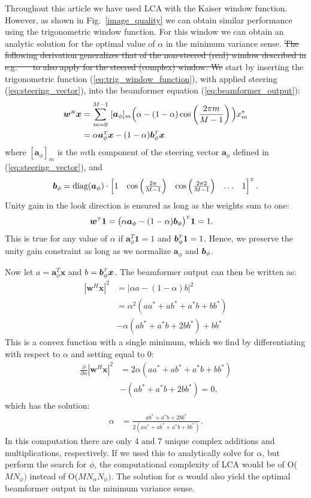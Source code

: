 \documentclass[10pt,journal,draftclsnofoot,onecolumn]{IEEEtran}
\newcommand\Fig[1]{Fig.~\ref{#1}}
\newcommand\nn{\nonumber\\}
\newcommand\sumb[2]{\sum\limits_{#1}^{#2}\;}
\newcommand\T{^{\scriptscriptstyle T}}
\renewcommand\H{^{\scriptscriptstyle H}}
\renewcommand\vec[1]{\boldsymbol{#1}}
\newcommand\1{\vec 1}
\renewcommand*\a{\vec a}
\newcommand*\w{\vec w}
\newcommand*\x{\vec x}
\providecommand{\DIFadd}[1]{{\protect\color{blue}\uwave{#1}}} %
\providecommand{\DIFdel}[1]{{\protect\color{red}\sout{#1}}}                      %
\providecommand{\DIFaddbegin}{} %
\providecommand{\DIFaddend}{} %
\providecommand{\DIFdelbegin}{} %
\providecommand{\DIFdelend}{} %
\begin{document}
Throughout this article we have used LCA with the Kaiser window function. However, as shown in \Fig{image_quality} we can obtain similar performance using the trigonometric window function. For this window we can obtain an analytic solution for the optimal value of $\alpha$ in the minimum variance sense. \DIFdelbegin \DIFdel{The following derivation generalizes that of the non-steered (real) window described in e.g.~\mbox{%
\cite{Stoica2005}
}%
to also apply for the steered (complex) window. We }\DIFdelend \DIFaddbegin \DIFadd{To derive it, we }\DIFaddend start by inserting the trigonometric function (\ref{eq:trig_window_function}), with applied steering (\ref{eq:steering_vector}), into the beamformer equation (\ref{eq:beamformer_output}):
%
\begin{align}
\w\H\x &= \sumb{m=0}{M-1} [\a_\phi]_m\Big(\alpha - (1-\alpha)\cos\left(\frac{2\pi m}{M-1}\right)\Big) x_m^* \nn
&= \alpha \a_\phi\T\x - (1-\alpha)\b_\phi\T\x
\end{align}
%
where $[\a_\phi]_m$ is the $m$th component of the steering vector $\a_\phi$ defined in (\ref{eq:steering_vector}), and 
%
\begin{align}
\b_\phi = \text{diag}(\a_\phi)\cdot\begin{bmatrix}
     1 &
     \cos\left(\frac{2\pi}{M-1}\right) &
     \cos\left(\frac{2\pi 2}{M-1}\right) &
     \hdots &
     1
     \end{bmatrix}\T.
\end{align}
%
Unity gain in the look direction is ensured as long as the weights sum to one:
%
\begin{align}
\w\T\1 &= \big(\alpha\a_\phi - (1-\alpha)\b_\phi\big)\T\1 = 1.
\end{align}
%
This is true for any value of $\alpha$ if $\a_\phi\T\1 = 1$ and $\b_\phi\T\1 = 1$. Hence, we  preserve the unity gain constraint as long as we normalize $\a_\phi$ and $\b_\phi$.

Now let $a=\a_\phi\T\x$ and $b=\b_\phi\T\x$. The beamformer output can then be written as:
%
\begin{align}
|\w\H\x|^2 &= \Big| \alpha a - (1-\alpha)b \Big|^2 \nn
&= \alpha^2 (aa^* + ab^* + a^*b + bb^*) \nn
&- \alpha(ab^* + a^*b + 2bb^*) + bb^*
\end{align}
%
This is a convex function with a single minimum, which we find by differentiating with respect to $\alpha$ and setting equal to 0:
%
\begin{align}
\frac{\partial}{\partial\alpha} |\w\H\x|^2 
&= 2\alpha (aa^* + ab^* + a^*b + bb^*) \nn
&- (ab^* + a^*b + 2bb^*) = 0,
\end{align}
%
which has the solution:
%
\begin{align}
\alpha &= \frac{ab^* + a^*b + 2bb^*}{2(aa^* + ab^* + a^*b + bb^*)}.
\end{align}
%
In this computation there are only 4 and 7 unique complex additions and multiplications, respectively. If we used this to analytically solve for $\alpha$, but perform the search for $\phi$, the computational complexity of LCA would be of O($MN_\phi)$ instead of O($MN_\alpha N_\phi)$. The solution for $\alpha$ would also yield the optimal beamformer output in the minimum variance sense.
\end{document}
